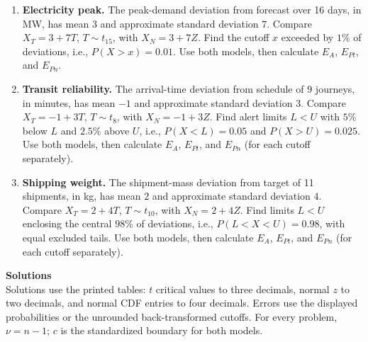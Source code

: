 \begin{enumerate}[leftmargin=*,label=\textbf{\arabic*.},itemsep=5pt,parsep=0pt,topsep=2pt]
		\item \textbf{Electricity peak.} The peak-demand deviation from forecast over 16 days, in MW, has mean $3$ and approximate standard deviation $7$. Compare $X_T=3+7T$, $T\sim t_{15}$, with $X_N=3+7Z$. Find the cutoff $x$ exceeded by $1\%$ of deviations, i.e., $P(X>x)=0.01$. Use both models, then calculate $E_A$, $E_{Pt}$, and $E_{Pn}$.
		\item \textbf{Transit reliability.} The arrival-time deviation from schedule of 9 journeys, in minutes, has mean $-1$ and approximate standard deviation $3$. Compare $X_T=-1+3T$, $T\sim t_{8}$, with $X_N=-1+3Z$. Find alert limits $L<U$ with $5\%$ below $L$ and $2.5\%$ above $U$, i.e., $P(X<L)=0.05$ and $P(X>U)=0.025$. Use both models, then calculate $E_A$, $E_{Pt}$, and $E_{Pn}$ (for each cutoff separately).
		\item \textbf{Shipping weight.} The shipment-mass deviation from target of 11 shipments, in kg, has mean $2$ and approximate standard deviation $4$. Compare $X_T=2+4T$, $T\sim t_{10}$, with $X_N=2+4Z$. Find limits $L<U$ enclosing the central $98\%$ of deviations, i.e., $P(L<X<U)=0.98$, with equal excluded tails. Use both models, then calculate $E_A$, $E_{Pt}$, and $E_{Pn}$ (for each cutoff separately).
	\end{enumerate}
	\newpage
	\textbf{\large Solutions}\\
	Solutions use the printed tables: $t$ critical values to three decimals, normal $z$ to two decimals, and normal CDF entries to four decimals. Errors use the displayed probabilities or the unrounded back-transformed cutoffs. For every problem, $\nu=n-1$; $c$ is the standardized boundary for both models.
